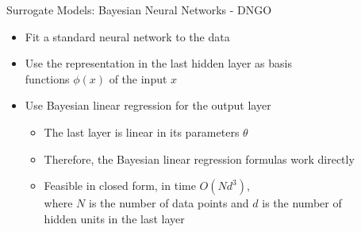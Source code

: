 \begin{frame}[c]{Surrogate Models: Bayesian Neural Networks - DNGO}

\begin{itemize}
    \item Fit a standard neural network to the data \pause
    \item Use the representation in the last hidden layer as basis \\ functions $\phi(x)$ of the input $x$ \pause
    \item Use Bayesian linear regression for the output layer
    \begin{itemize}
        \item The last layer is linear in its parameters $\theta$  \pause
        \item Therefore, the Bayesian linear regression formulas work directly \pause
        \item Feasible in closed form, in time $O(N d^3)$, \\ where $N$ is the number of data points and $d$ is the number of \\ hidden units in the last layer \pause
    \end{itemize}
    
\end{itemize}

\end{frame}


